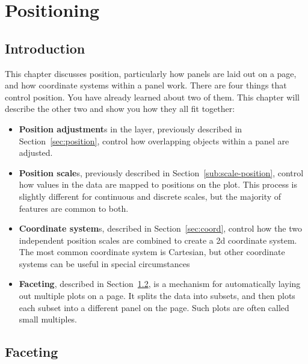 
% 


\chapter{Positioning}
\label{cha:position}

\section{Introduction}

This chapter discusses position, particularly how panels are laid out on a page, and how coordinate systems within a panel work.  There are four things that control position.  You have already learned about two of them.  This chapter will describe the other two and show you how they all fit together:

\begin{itemize}
  \item {\bf Position adjustment}s in the layer, previously described in Section~\ref{sec:position}, control how overlapping objects within a panel are adjusted.

  \item {\bf Position scale}s, previously described in Section~\ref{sub:scale-position}, control how values in the data are mapped to positions on the plot.  This process is slightly different for continuous and discrete scales, but the majority of features are common to both.

  \item {\bf Coordinate system}s, described in Section~\ref{sec:coord}, control how the two independent position scales are combined to create a 2d coordinate system.  The most common coordinate system is Cartesian, but other coordinate systems can be useful in special circumstances

  \item {\bf Faceting}, described in Section~\ref{sec:faceting}, is a mechanism for automatically laying out multiple plots on a page.  It splits the data into subsets, and then plots each subset into a different panel on the page.  Such plots are often called small multiples.  
  
\end{itemize}

\section{Faceting}
\label{sec:faceting}


